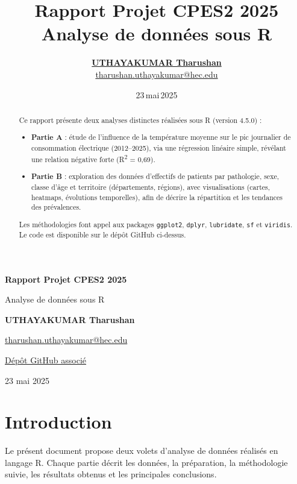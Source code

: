 \documentclass[12pt,a4paper]{article}
\title{Rapport Projet CPES2 2025\\Analyse de données sous R}
\author{%
  \href{https://www.linkedin.com/in/utharushan/}{\textbf{UTHAYAKUMAR Tharushan}}\\[0.5em]
  \href{mailto:tharushan.uthayakumar@hec.edu}{tharushan.uthayakumar@hec.edu}
}
\date{23 mai 2025}
\begin{document}
\begin{titlepage}
  \centering
  \vspace*{2cm}
  {\LARGE\bfseries Rapport Projet CPES2 2025\par}
  \vspace{1em}
  {\Large Analyse de données sous R\par}
  \vfill
  {\large\textbf{UTHAYAKUMAR Tharushan}\par}
  \vspace{0.5em}
  {\small\href{mailto:tharushan.uthayakumar@hec.edu}{tharushan.uthayakumar@hec.edu}\par}
  \vspace{1em}
  {\small\href{https://github.com/Utharushan/Projet-Final-Intro-a-R-CPES-Saclay}{Dépôt GitHub associé}\par}
  \vfill
  {\normalsize 23 mai 2025\par}
\end{titlepage}

\begin{abstract}
Ce rapport présente deux analyses distinctes réalisées sous R (version 4.5.0) :
\begin{itemize}
  \item \textbf{Partie A} : étude de l'influence de la température moyenne sur le pic journalier de consommation électrique (2012--2025), via une régression linéaire simple, révélant une relation négative forte (R\textsuperscript{2} = 0,69).
  \item \textbf{Partie B} : exploration des données d'effectifs de patients par pathologie, sexe, classe d'âge et territoire (départements, régions), avec visualisations (cartes, heatmaps, évolutions temporelles), afin de décrire la répartition et les tendances des prévalences.
\end{itemize}
Les méthodologies font appel aux packages \texttt{ggplot2}, \texttt{dplyr}, \texttt{lubridate}, \texttt{sf} et \texttt{viridis}. Le code est disponible sur le dépôt GitHub ci-dessus.
\end{abstract}

\newpage
\tableofcontents
\newpage

\section*{Introduction}
Le présent document propose deux volets d'analyse de données réalisés en langage R. Chaque partie décrit les données, la préparation, la méthodologie suivie, les résultats obtenus et les principales conclusions.
\end{document}
